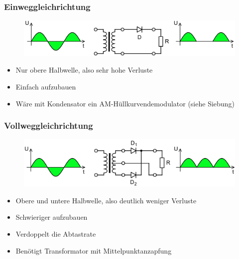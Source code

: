 \begin{frame}
  \frametitle{Einweggleichrichtung}
  \begin{center}
    \begin{figure}
      \includegraphics[width=1\textwidth,height=.6\textheight,keepaspectratio]{a05/Halfwave_rectifier.png}
    \end{figure}
    \begin{itemize}
      \item Nur obere Halbwelle, also sehr hohe Verluste
      \item Einfach aufzubauen
      \item Wäre mit Kondensator ein AM-Hüllkurvendemodulator (siehe Siebung)
    \end{itemize}
  \end{center}
\end{frame}

\begin{frame}
  \frametitle{Vollweggleichrichtung}
  \begin{center}
    \begin{figure}
      \includegraphics[width=1\textwidth,height=.6\textheight,keepaspectratio]{a05/Fullwave_rectifier.png}
    \end{figure}
    \begin{itemize}
      \item Obere und untere Halbwelle, also deutlich weniger Verluste
      \item Schwieriger aufzubauen
      \item Verdoppelt die Abtastrate
      \item Benötigt Transformator mit Mittelpunktanzapfung
    \end{itemize}
  \end{center}
\end{frame}

